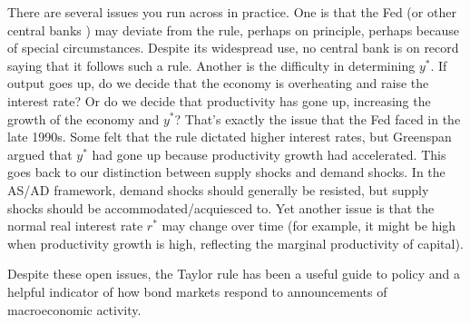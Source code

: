 There are several issues you run across in practice.
One is that the Fed (or other central banks ) may deviate from
the rule, perhaps on principle, perhaps because of special circumstances.
Despite its widespread use, no central bank  is on record
saying that it follows such a rule.
Another is the difficulty in determining $y^*$.
If output goes up, do we decide that the economy is overheating
and raise the interest rate?
Or do we decide that productivity has gone up,
increasing the growth of the economy and $y^*$?
That's exactly the issue that the Fed faced in the late 1990s.
Some felt that the rule dictated higher interest rates,
but Greenspan argued that $y^*$ had gone up because
productivity growth had accelerated.
This goes back to our distinction between
supply shocks and demand shocks. 
In the AS/AD framework,
demand shocks should generally be resisted,
but supply shocks should be accommodated/acquiesced to. Yet another issue is that the
normal real interest rate $r^*$ may change over time (for example, it might be high
when productivity growth is high, reflecting the marginal productivity  of capital).

Despite these open issues, the Taylor rule has been a useful guide to policy
and a helpful indicator of how bond  markets respond to announcements
of macroeconomic activity.


